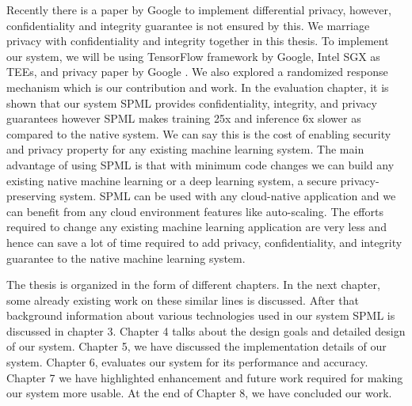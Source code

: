 Recently there is a paper by Google \cite{4} to implement differential privacy, however, confidentiality and integrity guarantee is not ensured by this. We marriage privacy with confidentiality and integrity together in this thesis. To implement our system, we will be using TensorFlow \cite{46} framework by Google, Intel SGX \cite{9} as TEEs, and privacy paper by Google \cite{4}. We also explored a randomized response mechanism which is our contribution and work. In the evaluation chapter, it is shown that our system SPML provides confidentiality, integrity, and privacy guarantees however SPML makes training 25x and inference 6x slower as compared to the native system. We can say this is the cost of enabling security and privacy property for any existing machine learning system. The main advantage of using SPML is that with minimum code changes we can build any existing native machine learning or a deep learning system, a secure privacy-preserving system. SPML can be used with any cloud-native application and we can benefit from any cloud environment features like auto-scaling. The efforts required to change any existing machine learning application are very less and hence can save a lot of time required to add privacy, confidentiality, and integrity guarantee to the native machine learning system.

The thesis is organized in the form of different chapters. In the next chapter, some already existing work on these similar lines is discussed. After that background information about various technologies used in our system SPML is discussed in chapter 3. Chapter 4 talks about the design goals and detailed design of our system. Chapter 5, we have discussed the implementation details of our system. Chapter 6, evaluates our system for its performance and accuracy. Chapter 7 we have highlighted enhancement and future work required for making our system more usable. At the end of Chapter 8, we have concluded our work.
